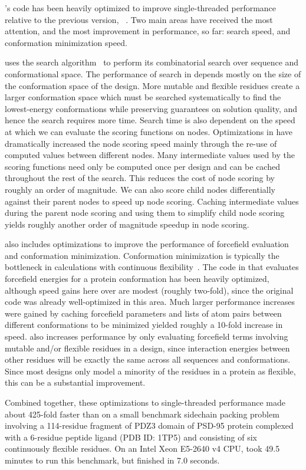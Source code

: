 's code has been heavily optimized to improve single-threaded performance relative to the previous version, ~\cite{COMETS}. Two main areas have received the most attention, and the most improvement in performance, so far: \as search speed, and conformation minimization speed.

\osprey uses the \as search algorithm~\cite{DEE/A*} to perform its combinatorial search over sequence and conformational space.  The performance of \as search in \osprey depends mostly on the size of the conformation space of the design. More mutable and flexible residues create a larger conformation space which must be searched systematically to find the lowest-energy conformations while preserving guarantees on solution quality, and hence the search requires more time. Search time is also dependent on the speed at which we can evaluate the scoring functions on \as nodes. Optimizations in  have dramatically increased the \as node scoring speed mainly through the re-use of computed values between different nodes. Many intermediate values used by the \as scoring functions need only be computed once per design and can be cached throughout the rest of the search. This reduces the cost of node scoring by roughly an order of magnitude. We can also score child nodes differentially against their parent nodes to speed up node scoring. Caching intermediate values during the parent node scoring and using them to simplify child node scoring yields roughly another order of magnitude speedup in \as node scoring. %

 also includes optimizations to improve the performance of forcefield evaluation and conformation minimization. Conformation minimization is typically the bottleneck in \osprey calculations with continuous flexibility~\cite{minDEE,iMinDEE,DEEPer,CATS}.  The code in  that evaluates forcefield energies for a protein conformation has been heavily optimized, although speed gains here over  are modest (roughly two-fold), since the original code was already well-optimized in this area. Much larger performance increases were gained by caching forcefield parameters and lists of atom pairs between different conformations to be minimized yielded roughly a 10-fold increase in speed.  also increases performance by only evaluating forcefield terms involving mutable and/or flexible residues in a design, since interaction energies between other residues will be exactly the same across all sequences and conformations.  Since most designs only model a minority of the residues in a protein as flexible, this can be a substantial improvement. 

Combined together, these optimizations to single-threaded performance made  about 425-fold faster than  on a small benchmark sidechain packing problem involving a 114-residue fragment of PDZ3 domain of PSD-95 protein complexed with a 6-residue peptide ligand (PDB ID: 1TP5) and consisting of six continuously flexible residues.  On an Intel Xeon E5-2640 v4 CPU,  took 49.5 minutes to run this benchmark, but  finished in 7.0 seconds.  
